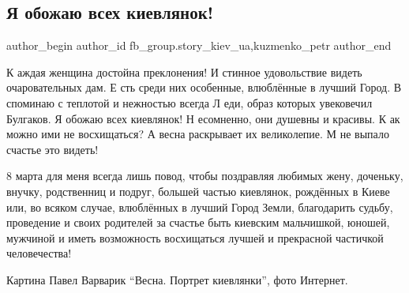  
 
 
 
 
 
\subsection{Я обожаю всех киевлянок!}
\label{sec:07_03_2021.fb.fb_group.story_kiev_ua.1.kievljanki}
 
\ifcmt
 author_begin
   author_id fb_group.story_kiev_ua,kuzmenko_petr
 author_end
\fi

\begin{zznagolos}
\obeycr
К аждая женщина достойна преклонения!
И стинное удовольствие видеть очаровательных дам. 
Е сть среди них особенные, влюблённые в лучший Город. 
В споминаю с теплотой и нежностью всегда
Л еди, образ которых увековечил Булгаков.
Я обожаю всех киевлянок!
Н есомненно, они душевны и красивы.
К ак можно ими не восхищаться? 
А весна раскрывает их великолепие.
М не выпало счастье это видеть!
\restorecr
\end{zznagolos}


8 марта для меня всегда лишь повод, чтобы поздравляя любимых жену, доченьку,
внучку, родственниц и подруг, большей частью киевлянок, рождённых в Киеве
или, во всяком случае, влюблённых в лучший Город Земли, благодарить судьбу,
проведение и своих родителей за счастье быть киевским мальчишкой, юношей,
мужчиной и иметь возможность восхищаться лучшей и прекрасной частичкой
человечества!

Картина Павел Варварик \enquote{Весна. Портрет киевлянки}, фото Интернет.

